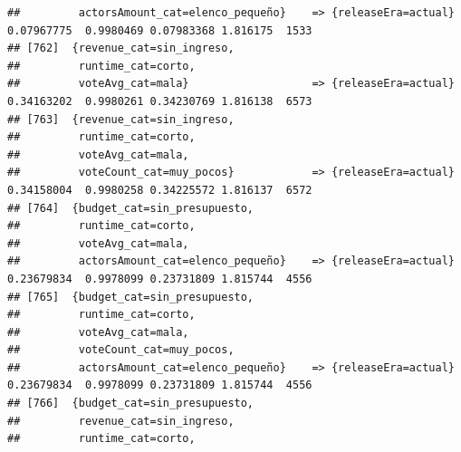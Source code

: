 \documentclass[
]{article}
\begin{document}
\begin{verbatim}
##         actorsAmount_cat=elenco_pequeño}    => {releaseEra=actual}               0.07967775  0.9980469 0.07983368 1.816175  1533
## [762]  {revenue_cat=sin_ingreso,                                                                                                
##         runtime_cat=corto,                                                                                                      
##         voteAvg_cat=mala}                   => {releaseEra=actual}               0.34163202  0.9980261 0.34230769 1.816138  6573
## [763]  {revenue_cat=sin_ingreso,                                                                                                
##         runtime_cat=corto,                                                                                                      
##         voteAvg_cat=mala,                                                                                                       
##         voteCount_cat=muy_pocos}            => {releaseEra=actual}               0.34158004  0.9980258 0.34225572 1.816137  6572
## [764]  {budget_cat=sin_presupuesto,                                                                                             
##         runtime_cat=corto,                                                                                                      
##         voteAvg_cat=mala,                                                                                                       
##         actorsAmount_cat=elenco_pequeño}    => {releaseEra=actual}               0.23679834  0.9978099 0.23731809 1.815744  4556
## [765]  {budget_cat=sin_presupuesto,                                                                                             
##         runtime_cat=corto,                                                                                                      
##         voteAvg_cat=mala,                                                                                                       
##         voteCount_cat=muy_pocos,                                                                                                
##         actorsAmount_cat=elenco_pequeño}    => {releaseEra=actual}               0.23679834  0.9978099 0.23731809 1.815744  4556
## [766]  {budget_cat=sin_presupuesto,                                                                                             
##         revenue_cat=sin_ingreso,                                                                                                
##         runtime_cat=corto,                                                                                                      

\end{verbatim}
\end{document}
